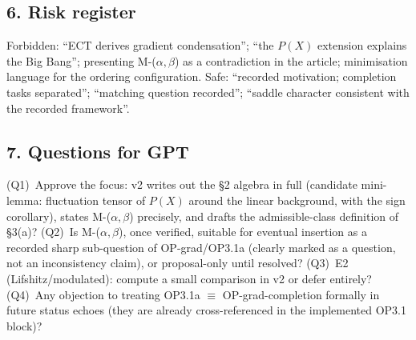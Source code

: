 \subsection*{6. Risk register}
Forbidden: ``ECT derives gradient condensation''; ``the $P(X)$
extension explains the Big Bang''; presenting M-($\alpha,\beta$)
as a contradiction in the article; minimisation language for the
ordering configuration.
Safe: ``recorded motivation; completion tasks separated'';
``matching question recorded''; ``saddle character consistent with
the recorded framework''.

\subsection*{7. Questions for GPT}
(Q1)~Approve the focus: v2 writes out the \S2 algebra in full
(candidate mini-lemma: fluctuation tensor of $P(X)$ around the
linear background, with the sign corollary), states
M-($\alpha,\beta$) precisely, and drafts the admissible-class
definition of \S3(a)?
(Q2)~Is M-($\alpha,\beta$), once verified, suitable for eventual
insertion as a recorded sharp sub-question of OP-grad/OP3.1a
(clearly marked as a question, not an inconsistency claim), or
proposal-only until resolved?
(Q3)~E2 (Lifshitz/modulated): compute a small comparison in v2 or
defer entirely?
(Q4)~Any objection to treating OP3.1a $\equiv$ OP-grad-completion
formally in future status echoes (they are already cross-referenced
in the implemented OP3.1 block)?
